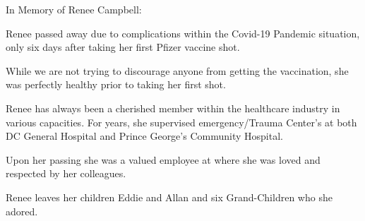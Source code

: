 In Memory of Renee Campbell:

Renee passed away due to complications within the Covid-19 Pandemic situation,
only six days after taking her first Pfizer vaccine shot.

While we are not trying to discourage anyone from getting the vaccination, she
was perfectly healthy prior to taking her first shot.

Renee has always been a cherished member within the healthcare industry in
various capacities. For years, she supervised emergency/Trauma Center’s at both
DC General Hospital and Prince George’s Community Hospital.

Upon her passing she was a valued employee at where she was loved and respected
by her colleagues.

Renee leaves her children Eddie and Allan and six Grand-Children who she adored.

